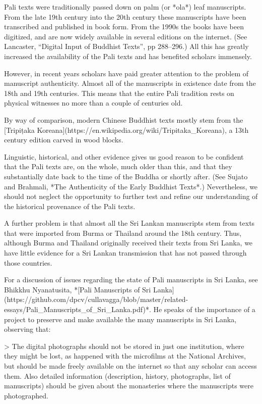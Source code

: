 \documentclass[11pt, openany,a5paper]{article}
\begin{document}
\begin{markdown}
Pali texts were traditionally passed down on palm (or *ola*) leaf manuscripts. From the late 19th century into the 20th century these manuscripts have been transcribed and published in book form. From the 1990s the books have been digitized, and are now widely available in several editions on the internet. (See Lancaster, “Digital Input of Buddhist Texts”, pp 288–296.) All this has greatly increased the availability of the Pali texts and has benefited scholars immensely.

However, in recent years scholars have paid greater attention to the problem of manuscript authenticity. Almost all of the manuscripts in existence date from the 18th and 19th centuries. This means that the entire Pali tradition rests on physical witnesses no more than a couple of centuries old.

By way of comparison, modern Chinese Buddhist texts mostly stem from the [Tripiṭaka Koreana](https://en.wikipedia.org/wiki/Tripitaka_Koreana), a 13th century edition carved in wood blocks.

Linguistic, historical, and other evidence gives us good reason to be confident that the Pali texts are, on the whole, much older than this, and that they substantially date back to the time of the Buddha or shortly after. (See Sujato and Brahmali, *The Authenticity of the Early Buddhist Texts*.) Nevertheless, we should not neglect the opportunity to further test and refine our understanding of the historical provenance of the Pali texts.

A further problem is that almost all the Sri Lankan manuscripts stem from texts that were imported from Burma or Thailand around the 18th century. Thus, although Burma and Thailand originally received their texts from Sri Lanka, we have little evidence for a Sri Lankan transmission that has not passed through those countries.

For a discussion of issues regarding the state of Pali manuscripts in Sri Lanka, see Bhikkhu Nyanatusita, *[Pali Manuscripts of Sri Lanka](https://github.com/dpcv/cullavagga/blob/master/related-essays/Pali_Manuscripts_of_Sri_Lanka.pdf)*. He speaks of the importance of a project to preserve and make available the many manuscripts in Sri Lanka, observing that:

> The digital photographs should not be stored in just one institution, where they might be lost, as happened with the microfilms at the National Archives, but should be made freely available on the internet so that any scholar can access them. Also detailed information (description, history, photographs, list of manuscripts) should be given about the monasteries where the manuscripts were photographed.


\end{markdown}
\end{document}
